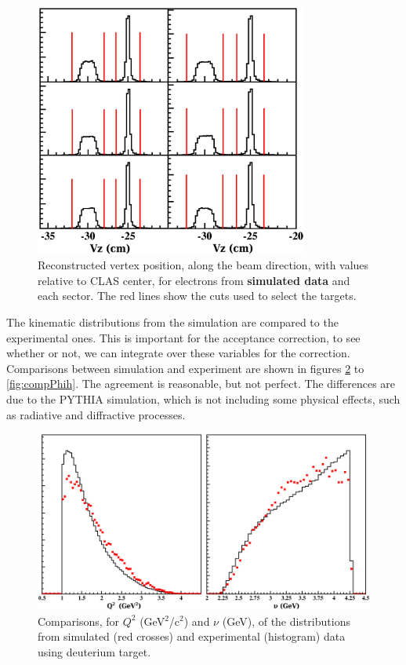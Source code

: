 
\begin{figure}[tpb]
\centering
\includegraphics[width=9cm] {chap5-fig/Vertex_el_sim.png}
\caption {Reconstructed vertex position, along the beam direction, with values 
relative to CLAS center, for electrons from {\bf simulated data} and each 
sector. The red lines show the cuts used to select the targets.}
\label{simvertex}
\end{figure}

The kinematic distributions from the simulation are compared to the 
experimental ones. This is important for the acceptance correction, to see 
whether or not, we can integrate over these variables for the correction.
Comparisons between simulation and experiment are shown in figures 
\ref{fig:compNuQ2} to \ref{fig:compPhih}. The agreement is reasonable, but not 
perfect. The differences are due to the PYTHIA simulation, which is not including some 
physical effects, such as radiative and diffractive processes.

\begin{figure}[tbp]
\centering
\includegraphics[width=12cm] {chap5-fig/El_compar.png}
\caption {Comparisons, for $Q^2$ (GeV$^2$/c$^2$) and $\nu$ (GeV), of the distributions
from simulated (red crosses) and experimental (histogram) data using deuterium target.}
\label{fig:compNuQ2}
\end{figure}

